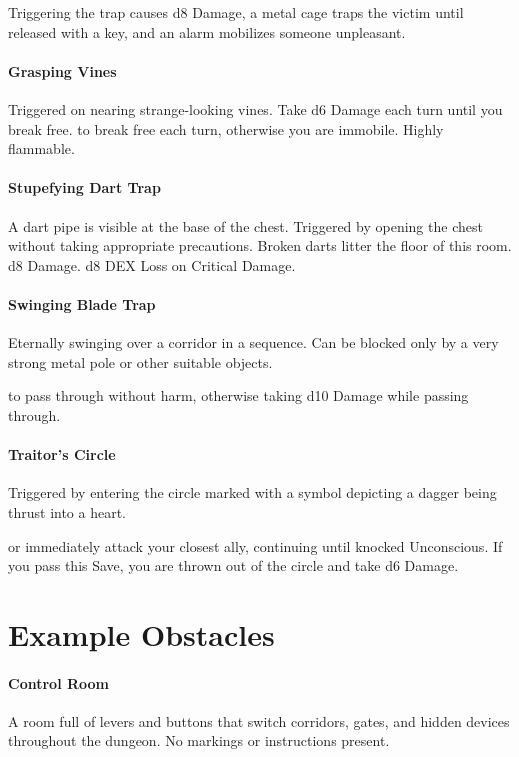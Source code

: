 \documentclass[itdr]{subfiles}
\begin{document}
Triggering the trap causes d8 Damage, a metal cage traps the victim until released with a key, and an alarm mobilizes someone unpleasant.

\vfill
\paragraph{Grasping Vines}
Triggered on nearing strange-looking vines. Take d6 Damage each turn until you break free.  to break free each turn, otherwise you are immobile. Highly flammable.

\vfill
\paragraph{Stupefying Dart Trap}
A dart pipe is visible at the base of the chest. Triggered by opening the chest without taking appropriate precautions. Broken darts litter the floor of this room.
d8 Damage. d8 DEX Loss on Critical Damage.

\vfill
\paragraph{Swinging Blade Trap}
Eternally swinging over a corridor in a sequence. Can be blocked only by a very strong metal pole or other suitable objects.

 to pass through without harm, otherwise taking d10 Damage while passing through.

\vfill
\paragraph{Traitor's Circle}
Triggered by entering the circle marked with a symbol depicting a dagger being thrust into a heart.

 or immediately attack your closest ally, continuing until knocked Unconscious. If you pass this Save, you are thrown out of the circle and take d6 Damage.

\vfill
\break

\section{Example Obstacles}

\paragraph{Control Room}
A room full of levers and buttons that switch corridors, gates, and hidden devices throughout the dungeon. No markings or instructions present.
\end{document}
